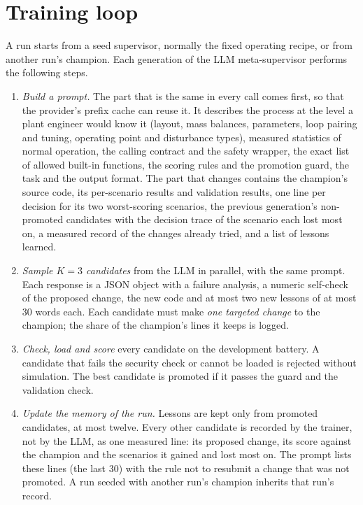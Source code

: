 \section{Training loop}
\label{sec:training-loop}
A run starts from a seed supervisor, normally the fixed operating recipe, or
from another run's champion. Each generation of the LLM meta-supervisor
performs the following steps.
\begin{enumerate}
\item \emph{Build a prompt.} The part that is the same in every call comes
  first, so that the provider's prefix cache can reuse it. It describes the
  process at the level a plant engineer would know it (layout, mass balances,
  parameters, loop pairing and tuning, operating point and disturbance
  types), measured statistics of normal operation, the calling contract and
  the safety wrapper, the exact list of allowed built-in functions, the
  scoring rules and the promotion guard, the task and the output format. The
  part that changes contains the champion's source code, its per-scenario
  results and validation results, one line per decision for its two worst-scoring
  scenarios, the previous generation's non-promoted candidates with the
  decision trace of the scenario each lost most on, a measured record of the
  changes already tried, and a list of lessons learned.
\item \emph{Sample $K = 3$ candidates} from the LLM in parallel, with the same
  prompt. Each response is a JSON object with a failure analysis, a numeric
  self-check of the proposed change, the new code and at most two new lessons
  of at most 30 words each. Each candidate must make
  \emph{one targeted change} to the champion; the share of the champion's
  lines it keeps is logged.
\item \emph{Check, load and score} every candidate on the development
  battery. A candidate that fails the security check or cannot be loaded is
  rejected without simulation. The best candidate is promoted if it passes
  the guard and the validation check.
\item \emph{Update the memory of the run.} Lessons are kept only from
  promoted candidates, at most twelve. Every other candidate is recorded by
  the trainer, not by the LLM, as one measured line: its proposed change, its
  score against the champion and the scenarios it gained and lost most on.
  The prompt lists these lines (the last 30) with the rule not to resubmit a
  change that was not promoted. A run seeded with another run's champion
  inherits that run's record.
\end{enumerate}

